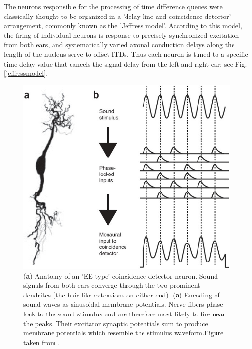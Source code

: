 The neurons responsible for 
the processing of time difference queues were classically thought to be organized in a 'delay line and coincidence detector' arrangement, commonly
known as the 'Jeffress model'\cite{jeffressmodel}. According to this model, the firing of individual neurons is response to precisely synchronized excitation
from both ears, and systematically varied axonal conduction delays along the length of the nucleus serve to offset ITDs. Thus each neuron is tuned to a 
specific time delay value that cancels the signal delay from the left and right ear; see Fig. \ref{jeffressmodel}.
\begin{figure}[ht!]
 \centering
 \includegraphics[width=0.7\linewidth]{Diagrams/EEtypedetector.jpg}
 \caption[EE-type coincidence detector and encoding of sound waves as membrane potentials.]{(\textbf{a}) Anatomy of an 'EE-type'
 coincidence detector neuron. Sound signals from both ears converge through the two prominent dendrites (the hair like extensions
 on either end). (\textbf{a}) Encoding of sound waves as sinusoidal membrane potentials. Nerve fibers phase lock to the sound stimulus and
 are therefore most likely to fire near the peaks. Their excitator synaptic potentials sum to produce membrane potentials which resemble the
 stimulus waveform.Figure taken from \cite{schnuppcarr}.}
 \label{EEtypedetector}
\end{figure}


